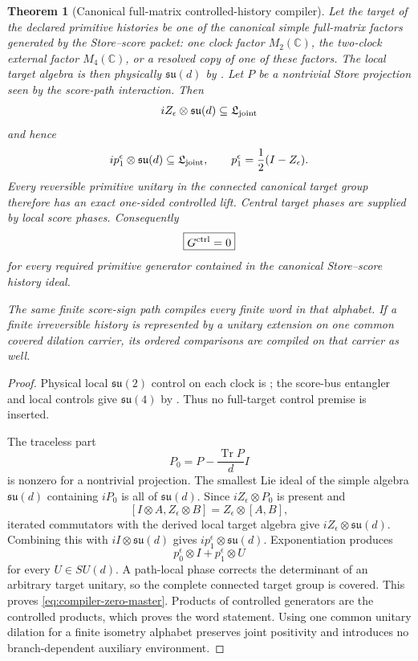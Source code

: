 \documentclass[11pt]{article}
\newtheorem{theorem}{Theorem}[section]
\theoremstyle{definition}
\theoremstyle{remark}
\newcommand{\C}{\mathbb C}
\newcommand{\Tr}{\operatorname{Tr}}
\begin{document}
\begin{theorem}[Canonical full-matrix controlled-history compiler]
\label{thm:canonical-history-compiler-master}
Let the target of the declared primitive histories be one of the canonical
simple full-matrix factors generated by the Store--score packet: one clock
factor $M_2(\C)$, the two-clock external factor $M_4(\C)$, or a resolved copy
of one of these factors.  The local target algebra is then physically
$\mathfrak{su}(d)$ by
.
Let $P$ be a nontrivial Store projection seen by the score-path interaction.
Then
\[
 iZ_{\epsilon}\otimes\mathfrak{su}(d)
 \subseteq\mathfrak L_{\rm joint}
\]
and hence
\[
 ip_1^{\epsilon}\otimes\mathfrak{su}(d)
 \subseteq\mathfrak L_{\rm joint},
 \qquad
 p_1^{\epsilon}=\frac12(I-Z_{\epsilon}).
\]
Every reversible primitive unitary in the connected canonical target group
therefore has an exact one-sided controlled lift.  Central target phases are
supplied by local score phases.  Consequently
\begin{equation}
 \boxed{G^{\rm ctrl}=0}
 \label{eq:compiler-zero-master}
\end{equation}
for every required primitive generator contained in the canonical
Store--score history ideal.

The same finite score-sign path compiles every finite word in that alphabet.
If a finite irreversible history is represented by a unitary extension on one
common covered dilation carrier, its ordered comparisons are compiled on that
carrier as well.
\end{theorem}

\begin{proof}
Physical local $\mathfrak{su}(2)$ control on each clock is
; the score-bus entangler and local
controls give $\mathfrak{su}(4)$ by
.  Thus no
full-target control premise is inserted.

The traceless part
\[
 P_0=P-\frac{\Tr P}{d}I
\]
is nonzero for a nontrivial projection.  The smallest Lie ideal of the simple
algebra $\mathfrak{su}(d)$ containing $iP_0$ is all of
$\mathfrak{su}(d)$.  Since
$iZ_{\epsilon}\otimes P_0$ is present and
\[
 [I\otimes A,Z_{\epsilon}\otimes B]
 =Z_{\epsilon}\otimes[A,B],
\]
iterated commutators with the derived local target algebra give
$iZ_{\epsilon}\otimes\mathfrak{su}(d)$.  Combining this with
$iI\otimes\mathfrak{su}(d)$ gives
$ip_1^{\epsilon}\otimes\mathfrak{su}(d)$.  Exponentiation produces
\[
 p_0^{\epsilon}\otimes I
 +p_1^{\epsilon}\otimes U
\]
for every $U\in SU(d)$.  A path-local phase corrects the determinant of an
arbitrary target unitary, so the complete connected target group is covered.
This proves \eqref{eq:compiler-zero-master}.  Products of controlled
generators are the controlled products, which proves the word statement.
Using one common unitary dilation for a finite isometry alphabet preserves
joint positivity and introduces no branch-dependent auxiliary environment.
\end{proof}
\end{document}
